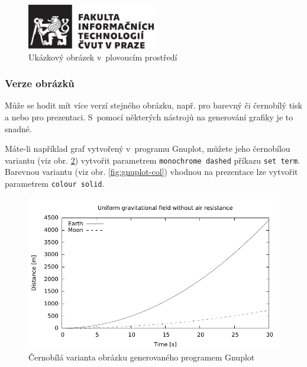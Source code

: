 \documentclass[thesis=B,czech]{FITthesis}[2019/03/06]
\begin{document}
\begin{figure}\centering
	\includegraphics[width=0.5\textwidth, angle=30]{cvut-logo-bw}
	\caption[Příklad obrázku]{Ukázkový obrázek v~plovoucím prostředí}\label{fig:float}
\end{figure}

\subsubsection{Verze obrázků}

Může se hodit mít více verzí stejného obrázku, např. pro barevný či černobílý tisk a nebo pro prezentaci. S~pomocí některých nástrojů na generování grafiky je to snadné.

Máte-li například graf vytvořený v~programu Gnuplot, můžete jeho černobílou variantu (viz obr. \ref{fig:gnuplot-bw}) vytvořit parametrem \verb|monochrome dashed| příkazu \verb|set term|. Barevnou variantu (viz obr. \ref{fig:gnuplot-col}) vhodnou na prezentace lze vytvořit parametrem \verb|colour solid|.

\begin{figure}\centering
	\includegraphics{gnuplot-bw}
	\caption[Gnuplot černobíle]{Černobílá varianta obrázku generovaného programem Gnuplot}\label{fig:gnuplot-bw}
\end{figure}
\end{document}
